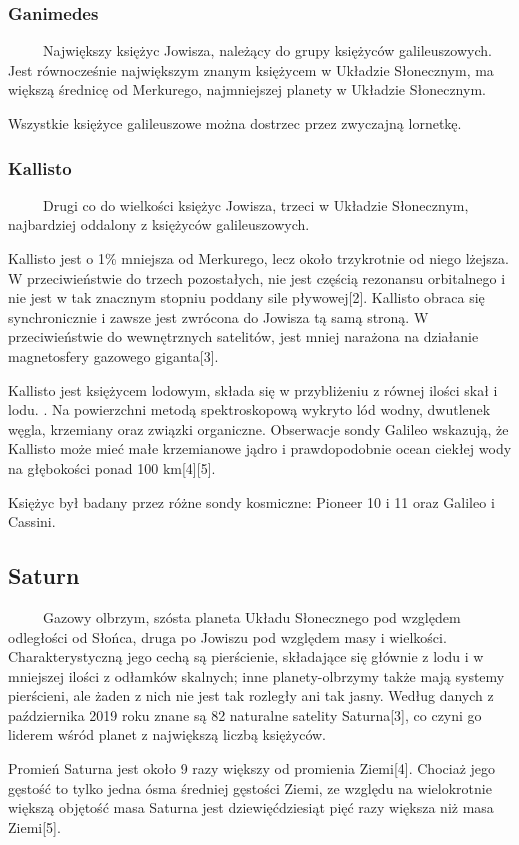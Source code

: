 \documentclass[12pt, letterpaper, titlepage]{article}
\begin{document}
\subsubsection{Ganimedes}
\ \ \ \ \ Największy księżyc Jowisza, należący do grupy księżyców galileuszowych. Jest równocześnie największym znanym księżycem w Układzie Słonecznym, ma większą średnicę od Merkurego, najmniejszej planety w Układzie Słonecznym.

Wszystkie księżyce galileuszowe można dostrzec przez zwyczajną lornetkę.
\subsubsection{Kallisto}
\ \ \ \ \  Drugi co do wielkości księżyc Jowisza, trzeci w Układzie Słonecznym, najbardziej oddalony z księżyców galileuszowych.

Kallisto jest o 1\% mniejsza od Merkurego, lecz około trzykrotnie od niego lżejsza.  W przeciwieństwie do trzech pozostałych, nie jest częścią rezonansu orbitalnego i nie jest w tak znacznym stopniu poddany sile pływowej[2]. Kallisto obraca się synchronicznie i zawsze jest zwrócona do Jowisza tą samą stroną. W przeciwieństwie do wewnętrznych satelitów, jest mniej narażona na działanie magnetosfery gazowego giganta[3].

Kallisto jest księżycem lodowym, składa się w przybliżeniu z równej ilości skał i lodu. . Na powierzchni metodą spektroskopową wykryto lód wodny, dwutlenek węgla, krzemiany oraz związki organiczne. Obserwacje sondy Galileo wskazują, że Kallisto może mieć małe krzemianowe jądro i prawdopodobnie ocean ciekłej wody na głębokości ponad 100 km[4][5].

Księżyc był badany przez różne sondy kosmiczne: Pioneer 10 i 11 oraz Galileo i Cassini.
\newpage
\subsection{Saturn}
\ \ \ \ \ Gazowy olbrzym, szósta planeta Układu Słonecznego pod względem odległości od Słońca, druga po Jowiszu pod względem masy i wielkości. Charakterystyczną jego cechą są pierścienie, składające się głównie z lodu i w mniejszej ilości z odłamków skalnych; inne planety-olbrzymy także mają systemy pierścieni, ale żaden z nich nie jest tak rozległy ani tak jasny. Według danych z października 2019 roku znane są 82 naturalne satelity Saturna[3], co czyni go liderem wśród planet z największą liczbą księżyców.

Promień Saturna jest około 9 razy większy od promienia Ziemi[4]. Chociaż jego gęstość to tylko jedna ósma średniej gęstości Ziemi, ze względu na wielokrotnie większą objętość masa Saturna jest dziewięćdziesiąt pięć razy większa niż masa Ziemi[5].
\end{document}
